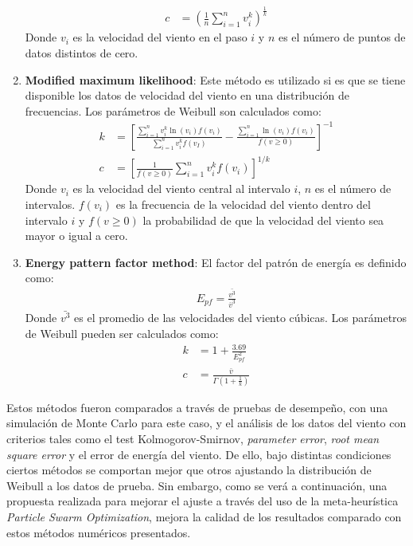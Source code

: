 \begin{enumerate}
\begin{align}
            c &= (\frac{1}{n}\sum_{i=1}^n v_i^k)^{\frac{1}{k}}
        \end{align}    
         Donde $v_i$ es la velocidad del viento en el paso $i$ y $n$ es el número de puntos de datos distintos de cero. 
    \item \textbf{Modified maximum likelihood}: Este método es utilizado si es que se tiene disponible los datos de velocidad del viento en una distribución de frecuencias. Los parámetros de Weibull son calculados como:
        \begin{align}
            k &= [\frac{\sum_{i=1}^n v_i^k \ln(v_i)f(v_i)}{\sum_{i=1}^n v_i^kf(v_I)} - \frac{\sum_{i=1}^n\ln(v_i)f(v_i)}{f(v \geq 0)}]^{-1}\\
            c &= [\frac{1}{f(v \geq 0)}\sum_{i=1}^n v_i^{k}f(v_i)]^{1/k}
        \end{align}
         Donde $v_i$ es la velocidad del viento central al intervalo $i$, $n$ es el número de intervalos. $f(v_i)$ es la frecuencia de la velocidad del viento dentro del intervalo $i$ y $f(v \geq 0)$ la probabilidad de que la velocidad del viento sea mayor o igual a cero.
    \item \textbf{Energy pattern factor method}: El factor del patrón de energía es definido como:
        \begin{align}
            E_{pf} = \frac{\bar{v^3}}{\bar{v}^3}
        \end{align}   
         Donde $\bar{v^3}$ es el promedio de las velocidades del viento cúbicas. Los parámetros de Weibull pueden ser calculados como:
        \begin{align}
            k &= 1 + \frac{3.69}{E_{pf}^2}\\
            c &= \frac{\bar{v}}{\Gamma(1 + \frac{1}{k})}
        \end{align}    
 \end{enumerate}     
 Estos métodos fueron comparados a través de pruebas de desempeño, con una simulación de Monte Carlo para este caso, y el análisis de los datos del viento con criterios tales como el test Kolmogorov-Smirnov, \emph{parameter error}, \emph{root mean square error} y el error de energía del viento. De ello, bajo distintas condiciones ciertos métodos se comportan mejor que otros ajustando la distribución de Weibull a los datos de prueba. Sin embargo, como se verá a continuación, una propuesta realizada para mejorar el ajuste a través del uso de la meta-heurística \emph{Particle Swarm Optimization}, mejora la calidad de los resultados comparado con estos métodos numéricos presentados.  
